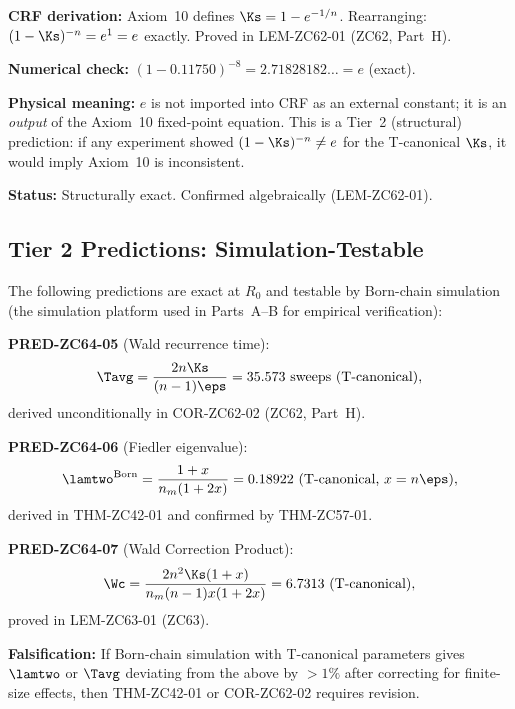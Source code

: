 \documentclass[12pt, a4paper]{article}
\begin{document}
\begin{predbox}[title={PRED-ZC64-04: $e = (1-\Ks)^{-n}$ exact
  (Tier~2, structural; inherits LEM-ZC62-01)}]
\textbf{CRF derivation:} Axiom~10 defines $\Ks = 1-e^{-1/n}$.
Rearranging: $(1-\Ks)^{-n} = e^1 = e$ exactly.
Proved in LEM-ZC62-01 (ZC62, Part~H).

\textbf{Numerical check:}
$(1-0.11750)^{-8} = 2.71828182\ldots = e$ \hfill (exact).

\textbf{Physical meaning:} $e$ is not imported into CRF as an
external constant; it is an \emph{output} of the Axiom~10
fixed-point equation. This is a Tier~2 (structural) prediction:
if any experiment showed $(1-\Ks)^{-n} \neq e$ for the
T-canonical $\Ks$, it would imply Axiom~10 is
inconsistent.

\textbf{Status:} Structurally exact.
Confirmed algebraically (LEM-ZC62-01).
\end{predbox}

\subsection{Tier 2 Predictions: Simulation-Testable}
\label{sec:tier2}

\begin{predbox}[title={PRED-ZC64-05 through PRED-ZC64-07:
  Simulation-Testable Internal Predictions (Tier~2)}]
The following predictions are exact at $R_0$ and testable
by Born-chain simulation (the simulation platform used
in Parts~A--B for empirical verification):

\medskip
\textbf{PRED-ZC64-05} (Wald recurrence time):
\[
  \Tavg = \frac{2n\Ks}{(n-1)\eps}
  = 35.573 \text{ sweeps (T-canonical)},
\]
derived unconditionally in COR-ZC62-02 (ZC62, Part~H).

\medskip
\textbf{PRED-ZC64-06} (Fiedler eigenvalue):
\[
  \lamtwo^{\rm Born} = \frac{1+x}{n_m(1+2x)}
  = 0.18922 \text{ (T-canonical, } x = n\eps\text{)},
\]
derived in THM-ZC42-01 and confirmed by THM-ZC57-01.

\medskip
\textbf{PRED-ZC64-07} (Wald Correction Product):
\[
  \Wc = \frac{2n^2\Ks(1+x)}{n_m(n-1)x(1+2x)}
  = 6.7313 \text{ (T-canonical)},
\]
proved in LEM-ZC63-01 (ZC63).

\medskip
\textbf{Falsification:} If Born-chain simulation with
T-canonical parameters gives $\lamtwo$ or $\Tavg$ deviating
from the above by $>\!1\%$ after correcting for
finite-size effects, then THM-ZC42-01 or COR-ZC62-02
requires revision.
\end{predbox}
\end{document}
